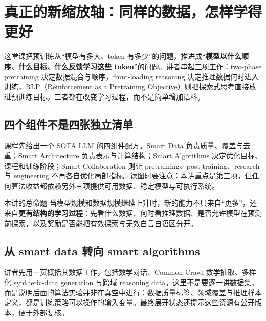 \section{真正的新缩放轴：同样的数据，怎样学得更好}

这堂课把预训练从“模型有多大、token 有多少”的问题，推进成“\textbf{模型以什么顺序、什么目标、什么反馈学习这些 token}”的问题。讲者串起三项工作：two-phase pretraining 决定数据混合与顺序，front-loading reasoning 决定推理数据何时进入训练，RLP（Reinforcement as a Pretraining Objective）则把探索式思考直接放进预训练目标。三者都在改变学习过程，而不是简单增加语料。

\subsection{四个组件不是四张独立清单}

课程先给出一个 SOTA LLM 的四组件配方。Smart Data 负责质量、覆盖与去重；Smart Architecture 负责表示与计算结构；Smart Algorithms 决定优化目标、课程和训练阶段；Smart Collaboration 则让 pretraining、post-training、research 与 engineering 不再各自优化局部指标。读图时要注意：本讲重点是第三项，但任何算法收益都依赖另外三项提供可用数据、稳定模型与可执行系统。



\begin{importantbox}{本讲的总命题}
当模型规模和数据规模继续上升时，新的能力不只来自“更多”，还来自\textbf{更有结构的学习过程}：先看什么数据、何时看推理数据、是否允许模型在预测前探索，以及奖励是否能把有效探索与无效自言自语区分开。
\end{importantbox}

\subsection{从 smart data 转向 smart algorithms}

讲者先用一页概括其数据工作，包括数学对话、Common Crawl 数学抽取、多样化 synthetic-data generation 与跨域 reasoning data。这里不是要逐一讲数据集，而是说明后面的算法实验并非在真空中进行：数据质量标签、领域覆盖与推理样本定义，都是训练策略可以操作的输入变量。最终展开状态还提示这些资源有公开版本，便于外部复核。

